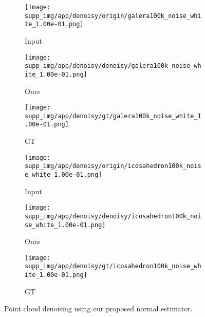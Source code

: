 \documentclass[runningheads]{llncs}
\begin{document}
\begin{figure}
	\begin{center}
	\begin{subfigure}{0.15\linewidth}
		\texttt{[image: supp\_img/app/denoisy/origin/galera100k\_noise\_white\_1.00e-01.png]}
		\caption{Input}
	\end{subfigure}
	\begin{subfigure}{0.15\linewidth }
		\texttt{[image: supp\_img/app/denoisy/denoisy/galera100k\_noise\_white\_1.00e-01.png]}
		\caption{Ours}
	\end{subfigure}
	\begin{subfigure}{0.15\linewidth}
		\texttt{[image: supp\_img/app/denoisy/gt/galera100k\_noise\_white\_1.00e-01.png]}
		\caption{GT}
	\end{subfigure}
	\begin{subfigure}{0.15\linewidth}
		\texttt{[image: supp\_img/app/denoisy/origin/icosahedron100k\_noise\_white\_1.00e-01.png]}
		\caption{Input}
	\end{subfigure}
	\begin{subfigure}{0.15\linewidth}
		\texttt{[image: supp\_img/app/denoisy/denoisy/icosahedron100k\_noise\_white\_1.00e-01.png]}
		\caption{Ours}
	\end{subfigure}
	\begin{subfigure}{0.15   \linewidth}
		\texttt{[image: supp\_img/app/denoisy/gt/icosahedron100k\_noise\_white\_1.00e-01.png]}
		\caption{GT}
	\end{subfigure}
	\caption{Point cloud denoising using our proposed normal estimator. 
	}
	\label{fig:denoisy}
	\end{center}
\end{figure}
\end{document}
